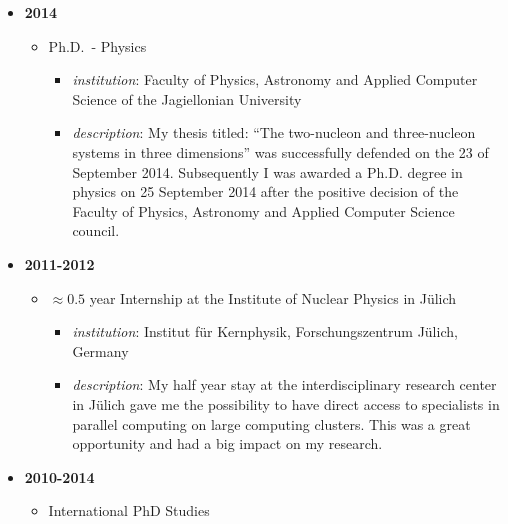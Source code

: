\documentclass{article}
\providecommand{\tightlist}{%
  \setlength{\itemsep}{0pt}\setlength{\parskip}{0pt}}
\begin{document}
\begin{itemize}
\tightlist
\item
  \textbf{2014}

  \begin{itemize}
  \tightlist
  \item
    Ph.D.~- Physics

    \begin{itemize}
    \tightlist
    \item
      \emph{institution}: Faculty of Physics, Astronomy and Applied
      Computer Science of the Jagiellonian University
    \item
      \emph{description}: My thesis titled: ``The two-nucleon and
      three-nucleon systems in three dimensions'' was successfully
      defended on the 23 of September 2014. Subsequently I was awarded a
      Ph.D. degree in physics on 25 September 2014 after the positive
      decision of the Faculty of Physics, Astronomy and Applied Computer
      Science council.
    \end{itemize}
  \end{itemize}
\item
  \textbf{2011-2012}

  \begin{itemize}
  \tightlist
  \item
    \(\approx 0.5\) year Internship at the Institute of Nuclear Physics
    in Jülich

    \begin{itemize}
    \tightlist
    \item
      \emph{institution}: Institut für Kernphysik, Forschungszentrum
      Jülich, Germany
    \item
      \emph{description}: My half year stay at the interdisciplinary
      research center in Jülich gave me the possibility to have direct
      access to specialists in parallel computing on large computing
      clusters. This was a great opportunity and had a big impact on my
      research.
    \end{itemize}
  \end{itemize}
\item
  \textbf{2010-2014}

  \begin{itemize}
  \tightlist
  \item
    International PhD Studies


\end{itemize}
\end{itemize}
\end{document}
